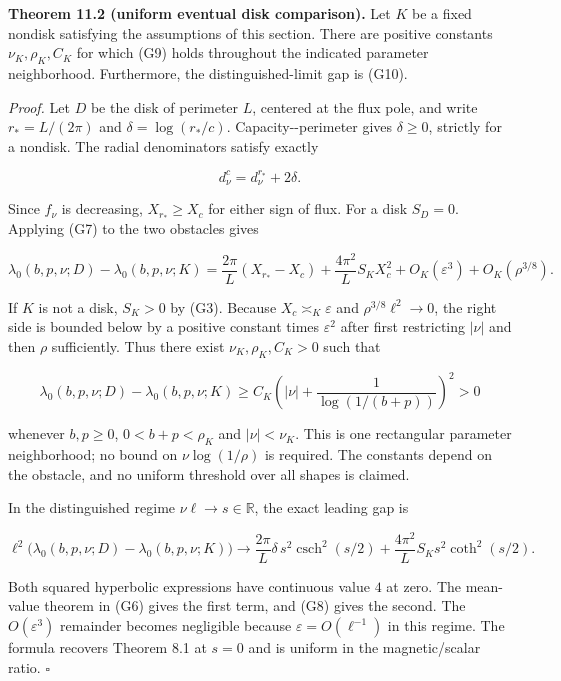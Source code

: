 \documentclass[11pt]{article}
\begin{document}
\textbf{Theorem 11.2 (uniform eventual disk comparison).} Let \(K\) be a
fixed nondisk satisfying the assumptions of this section. There are
positive constants \(\nu_K,\rho_K,C_K\) for which (G9) holds throughout
the indicated parameter neighborhood. Furthermore, the
distinguished-limit gap is (G10).

\emph{Proof.} Let \(D\) be the disk of perimeter \(L\), centered at the
flux pole, and write \(r_*=L/(2\pi)\) and \(\delta=\log(r_*/c)\).
Capacity-\/-perimeter gives \(\delta\geq0\), strictly for a nondisk. The
radial denominators satisfy exactly

\[d_\nu^c=d_\nu^{r_*}+2\delta.\]

Since \(f_\nu\) is decreasing, \(X_{r_*}\geq X_c\) for either sign of
flux. For a disk \(S_D=0\). Applying (G7) to the two obstacles gives

\[\lambda_0(b,p,\nu;D)-\lambda_0(b,p,\nu;K)
=\frac{2\pi}{L}(X_{r_*}-X_c)+\frac{4\pi^2}{L}S_KX_c^2
+O_K(\varepsilon^3)+O_K(\rho^{3/8}).\tag{G8}\]

If \(K\) is not a disk, \(S_K>0\) by (G3). Because
\(X_c\asymp_K\varepsilon\) and \(\rho^{3/8}\ell^2\to0\), the right side
is bounded below by a positive constant times \(\varepsilon^2\) after
first restricting \(|\nu|\) and then \(\rho\) sufficiently. Thus there
exist \(\nu_K,\rho_K,C_K>0\) such that

\[\lambda_0(b,p,\nu;D)-\lambda_0(b,p,\nu;K)
\geq C_K\left(|\nu|+\frac1{\log(1/(b+p))}\right)^2>0\tag{G9}\]

whenever \(b,p\geq0\), \(0<b+p<\rho_K\) and \(|\nu|<\nu_K\). This is one
rectangular parameter neighborhood; no bound on \(\nu\log(1/\rho)\) is
required. The constants depend on the obstacle, and no uniform threshold
over all shapes is claimed.

In the distinguished regime \(\nu\ell\to s\in\mathbb R\), the exact
leading gap is

\[\ell^2\bigl(\lambda_0(b,p,\nu;D)-\lambda_0(b,p,\nu;K)\bigr)
\longrightarrow \frac{2\pi}{L}\delta\,s^2\operatorname{csch}^2(s/2)
+\frac{4\pi^2}{L}S_Ks^2\coth^2(s/2).\tag{G10}\]

Both squared hyperbolic expressions have continuous value \(4\) at zero.
The mean-value theorem in (G6) gives the first term, and (G8) gives the
second. The \(O(\varepsilon^3)\) remainder becomes negligible because
\(\varepsilon=O(\ell^{-1})\) in this regime. The formula recovers
Theorem 8.1 at \(s=0\) and is uniform in the magnetic/scalar ratio.
\(\square\)
\end{document}

